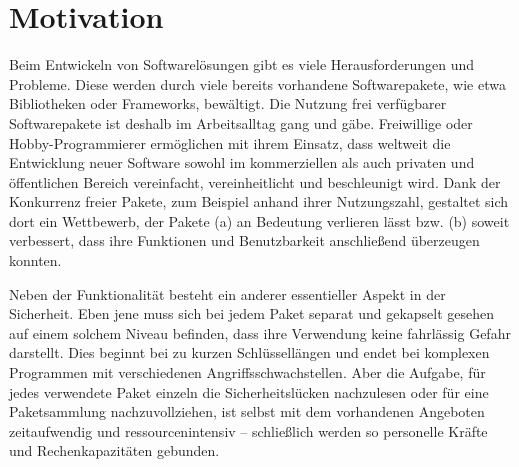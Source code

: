 \section{Motivation} \label{subsec:Motivation}
    Beim Entwickeln von Softwarelösungen gibt es viele Herausforderungen und Probleme. 
    Diese werden durch viele bereits vorhandene Softwarepakete, wie etwa Bibliotheken oder Frameworks, bewältigt.
    Die Nutzung frei verfügbarer Softwarepakete ist deshalb im Arbeitsalltag gang und gäbe.
    Freiwillige oder Hobby-Programmierer ermöglichen mit ihrem Einsatz, dass weltweit die Entwicklung neuer Software sowohl im kommerziellen als auch privaten und öffentlichen Bereich vereinfacht, vereinheitlicht und beschleunigt wird.
    Dank der Konkurrenz freier Pakete, zum Beispiel anhand ihrer Nutzungszahl, gestaltet sich dort ein Wettbewerb, der Pakete (a) an Bedeutung verlieren lässt bzw. (b) soweit verbessert, dass ihre Funktionen und Benutzbarkeit anschließend überzeugen konnten.

    Neben der Funktionalität besteht ein anderer essentieller Aspekt in der Sicherheit.
    Eben jene muss sich bei jedem Paket separat und gekapselt gesehen auf einem solchem Niveau befinden, dass ihre Verwendung keine fahrlässig Gefahr darstellt.
    Dies beginnt bei zu kurzen Schlüssellängen und endet bei komplexen Programmen mit verschiedenen Angriffsschwachstellen.
    Aber die Aufgabe, für jedes verwendete Paket einzeln die Sicherheitslücken nachzulesen oder für eine Paketsammlung nachzuvollziehen, ist selbst mit dem vorhandenen Angeboten zeitaufwendig und ressourcenintensiv -- schließlich werden so personelle Kräfte und Rechenkapazitäten gebunden.

